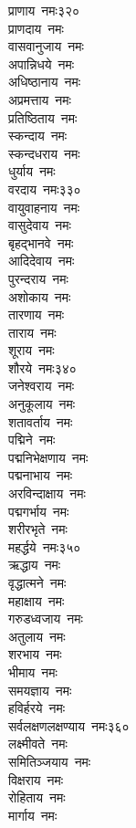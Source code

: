 \begin{multicols}{2}
\begin{flushleft}
प्राणाय~नमः\hfill ३२०\\
प्राणदाय~नमः\\
वासवानुजाय~नमः\\
अपान्निधये~नमः\\
अधिष्ठानाय~नमः\\
अप्रमत्ताय~नमः\\
प्रतिष्ठिताय~नमः\\
स्कन्दाय~नमः\\
स्कन्दधराय~नमः\\
धुर्याय~नमः\\
वरदाय~नमः\hfill ३३०\\
वायुवाहनाय~नमः\\
वासुदेवाय~नमः\\
बृहद्भानवे~नमः\\
आदिदेवाय~नमः\\
पुरन्दराय~नमः\\
अशोकाय~नमः\\
तारणाय~नमः\\
ताराय~नमः\\
शूराय~नमः\\
शौरये~नमः\hfill ३४०\\
जनेश्वराय~नमः\\
अनुकूलाय~नमः\\
शतावर्ताय~नमः\\
पद्मिने~नमः\\
पद्मनिभेक्षणाय~नमः\\
पद्मनाभाय~नमः\\
अरविन्दाक्षाय~नमः\\
पद्मगर्भाय~नमः\\
शरीरभृते~नमः\\
महर्द्धये~नमः\hfill ३५०\\
ऋद्धाय~नमः\\
वृद्धात्मने~नमः\\
महाक्षाय~नमः\\
गरुडध्वजाय~नमः\\
अतुलाय~नमः\\
शरभाय~नमः\\
भीमाय~नमः\\
समयज्ञाय~नमः\\
हविर्हरये~नमः\\
सर्वलक्षणलक्षण्याय~नमः\hfill ३६०\\
लक्ष्मीवते~नमः\\
समितिञ्जयाय~नमः\\
विक्षराय~नमः\\
रोहिताय~नमः\\
मार्गाय~नमः\\

\end{flushleft}
\end{multicols}

